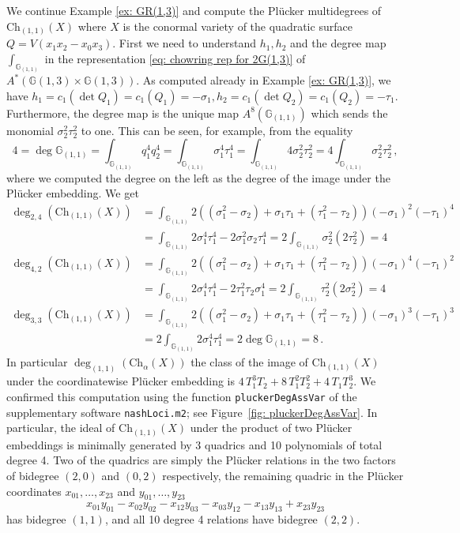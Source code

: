\documentclass[12pt]{article}
\theoremstyle{definition}
\newenvironment{example}
{\pushQED{\qed}\renewcommand{\qedsymbol}{$\diamond$}\examplex}
{\popQED\endexamplex}
\newcommand{\G}{{\mathbb G}}
\begin{document}
\begin{example}
We continue Example \ref{ex: GR(1,3)} and compute the Pl\"ucker multidegrees of $\mathrm{Ch}_{(1,1)}(X)$ where $X$ is the conormal variety of the quadratic surface $Q=V(x_1x_2-x_0x_3)$. First we need to understand $h_1,h_2$ and the degree map $\int_{\G_{(1,1)}}$ in the representation \eqref{eq: chowring rep for 2G(1,3)} of $A^*(\G(1,3)\times\G(1,3))$. As computed already in Example \ref{ex: GR(1,3)}, we have  $h_1=c_1(\det Q_1)=c_1(Q_1)=-\sigma_1,h_2=c_1(\det Q_2)=c_1(Q_2)=-\tau_1$. Furthermore, the degree map is the unique map $A^8(\G_{(1,1)})$ which sends the monomial $\sigma_2^2\tau_2^2$ to one. This can be seen, for example, from the equality
\[
    4=\deg\G_{(1,1)}=\int_{\G_{(1,1)}}q_1^4q_2^4=\int_{\G_{(1,1)}}\sigma_1^4\tau_1^4=\int_{\G_{(1,1)}}4\sigma_2^2\tau_2^2=4\int_{\G_{(1,1)}}\sigma_2^2\tau_2^2\,,
\]
where we computed the degree on the left as the degree of the image under the Pl\"ucker embedding. We get
\begin{align*}
    \deg_{2,4}(\mathrm{Ch}_{(1,1)}(X)) &= \int_{\G_{(1,1)}}2((\sigma_1^2-\sigma_2)+\sigma_1\tau_1+(\tau_1^2-\tau_2))(-\sigma_1)^2(-\tau_1)^4\\
    &= \int_{\G_{(1,1)}}2\sigma_1^4\tau_1^4-2\sigma_1^2\sigma_2\tau_1^4=2\int_{\G_{(1,1)}}\sigma_2^2(2\tau_2^2)=4\\
    \deg_{4,2}(\mathrm{Ch}_{(1,1)}(X)) &= \int_{\G_{(1,1)}}2((\sigma_1^2-\sigma_2)+\sigma_1\tau_1+(\tau_1^2-\tau_2))(-\sigma_1)^4(-\tau_1)^2\\
    &= \int_{\G_{(1,1)}}2\sigma_1^4\tau_1^4-2\tau_1^2\tau_2\sigma_1^4=2\int_{\G_{(1,1)}}\tau_2^2(2\sigma_2^2)=4\\
    \deg_{3,3}(\mathrm{Ch}_{(1,1)}(X)) &= \int_{\G_{(1,1)}}2((\sigma_1^2-\sigma_2)+\sigma_1\tau_1+(\tau_1^2-\tau_2))(-\sigma_1)^3(-\tau_1)^3\\
    &= 2\int_{\G_{(1,1)}}2\sigma_1^4\tau_1^4=2\deg\G_{(1,1)}=8\,.
\end{align*}
In particular $\deg_{(1,1)}(\mathrm{Ch}_\alpha(X))$ the class of the image of $\mathrm{Ch}_{(1,1)}(X)$ under the coordinatewise Pl\"ucker embedding is $4\,T_1^3T_2+8\,T_1^2T_2^2+4\,T_1T_2^3$.
We confirmed this computation using the function \texttt{pluckerDegAssVar} of the supplementary software \texttt{nashLoci.m2}; see Figure~\ref{fig: pluckerDegAssVar}.
In particular, the ideal of $\mathrm{Ch}_{(1,1)}(X)$ under the product of two Pl\"ucker embeddings is minimally generated by 3 quadrics and 10 polynomials of total degree 4. Two of the quadrics are simply the Pl\"ucker relations in the two factors of bidegree $(2,0)$ and $(0,2)$ respectively, the remaining quadric in the Pl\"ucker coordinates $x_{01},\ldots,x_{23}$ and $y_{01},\ldots,y_{23}$
\[
    x_{01}y_{01}-x_{02}y_{02}-x_{12}y_{03}-x_{03}y_{12}-x_{13}y_{13}+x_{23}y_{23}
\]
has bidegree $(1,1)$, and all 10 degree 4 relations have bidegree $(2,2)$.
\end{example}
\end{document}
